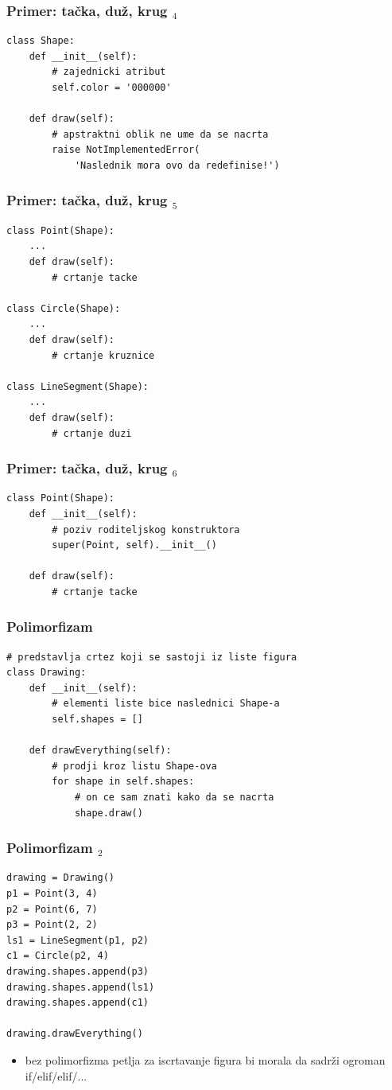 \documentclass[utf8,compress]{beamer}
\begin{document}
\begin{frame}[fragile]
  \frametitle{Primer: tačka, duž, krug $_4$}
\begin{verbatim}
class Shape:
    def __init__(self):
        # zajednicki atribut
        self.color = '000000'

    def draw(self):
        # apstraktni oblik ne ume da se nacrta
        raise NotImplementedError(
            'Naslednik mora ovo da redefinise!')
\end{verbatim}
\end{frame}

\begin{frame}
  \frametitle{Primer: tačka, duž, krug $_5$}
\begin{verbatim}
class Point(Shape):
    ...
    def draw(self):
        # crtanje tacke

class Circle(Shape):
    ...
    def draw(self):
        # crtanje kruznice

class LineSegment(Shape):
    ...
    def draw(self):
        # crtanje duzi
\end{verbatim}
\end{frame}

\begin{frame}
  \frametitle{Primer: tačka, duž, krug $_6$}
\begin{verbatim}
class Point(Shape):
    def __init__(self):
        # poziv roditeljskog konstruktora
        super(Point, self).__init__()
        
    def draw(self):
        # crtanje tacke
\end{verbatim}
\end{frame}

\begin{frame}[fragile]
  \frametitle{Polimorfizam}
\begin{verbatim}
# predstavlja crtez koji se sastoji iz liste figura
class Drawing:
    def __init__(self):
        # elementi liste bice naslednici Shape-a
        self.shapes = []

    def drawEverything(self):
        # prodji kroz listu Shape-ova
        for shape in self.shapes:
            # on ce sam znati kako da se nacrta
            shape.draw()
\end{verbatim}
\end{frame}

\begin{frame}[fragile]
  \frametitle{Polimorfizam $_2$}
\begin{verbatim}
drawing = Drawing()
p1 = Point(3, 4)
p2 = Point(6, 7)
p3 = Point(2, 2)
ls1 = LineSegment(p1, p2)
c1 = Circle(p2, 4)
drawing.shapes.append(p3)
drawing.shapes.append(ls1)
drawing.shapes.append(c1)

drawing.drawEverything()
\end{verbatim}
  \begin{itemize}
    \item bez polimorfizma petlja za iscrtavanje figura bi morala da sadrži ogroman if/elif/elif/...
  \end{itemize}
\end{frame}
\end{document}
